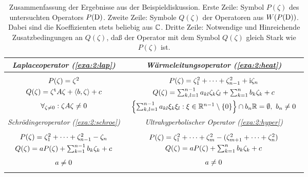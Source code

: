 \begin{table}
\begin{center}
\begin{tabular}{|c|c|}
\hline
{\em Laplaceoperator (\ref{exa:2:lap})}
&{\em Wärmeleitungsoperator (\ref{exa:2:heat})}\\
\hline
\hline
$\begin{array}{c}
P(\zeta)=\zeta^2\vphantom{\displaystyle\frac12}\\[3pt]
Q(\zeta)=\zeta^{\mathrm{t}}A\zeta+\langle b,\zeta\rangle+c\\[3pt]
\forall_{\zeta\neq0}:\zeta A\zeta\neq0\vphantom{\displaystyle\frac12}
\end{array}$
&
$\begin{array}{c}
P(\zeta)=\zeta^2_1+\dots+\zeta^2_{n-1}+\mathrm i\zeta_n\vphantom{\displaystyle\frac12}\\[3pt]
Q(\zeta)=\sum_{k,l=1}^{n-1}a_{kl}\zeta_k\zeta_l+\sum^n_{k=1}b_k\zeta_k+c\\[3pt]
\left\{\textstyle\sum^{n-1}_{k,l=1}a_{kl}\xi_k\xi_l:\xi\in\mathbb R^{n-1}\setminus\{0\}\right\}
\cap b_n\mathbb R=\emptyset,~b_n\neq0\vphantom{\displaystyle\frac12}
\end{array}$\\
\hline\hline
{\em Schrödingeroperator (\ref{exa:2:schroe})}
&{\em Ultrahyperbolischer Operator (\ref{exa:2:hyper})}\\
\hline\hline
$\begin{array}{c}
P(\zeta)=\zeta^2_1+\dots+\zeta^2_{n-1}-\zeta_n\vphantom{\displaystyle\frac12}\\[3pt]
Q(\zeta)=aP(\zeta)+\sum^{n-1}_{k=1}b_k\zeta_k+c\\[3pt]
a\neq0\vphantom{\displaystyle\frac12}
\end{array}$
&
$\begin{array}{c}
P(\zeta)=\zeta^2_1+\dots+\zeta^2_m-(\zeta^2_{m+1}+\dots+\zeta^2_n)
\vphantom{\displaystyle\frac12}\\[3pt]
Q(\zeta)=aP(\zeta)+\sum_{k=1}^nb_k\zeta_k+c\\[3pt]
a\neq0\vphantom{\displaystyle\frac12}
\end{array}$\\
\hline
\end{tabular}
\end{center}
\caption{Zusammenfassung der Ergebnisse aus der Beispieldiskussion.
Erste Zeile: Symbol $P(\zeta)$ des untersuchten Operators $P(\mathrm D)$.
Zweite Zeile: Symbole $Q(\zeta)$ der Operatoren aus $W(P(\mathrm D))$.
Dabei sind die Koeffizienten stets beliebig aus $\mathbb C$.
Dritte Zeile: Notwendige und Hinreichende Zusatzbedingungen an $Q(\zeta)$,
daß der Operator mit dem Symbol $Q(\zeta)$
gleich Stark wie $P(\zeta)$ ist.}
\end{table}

